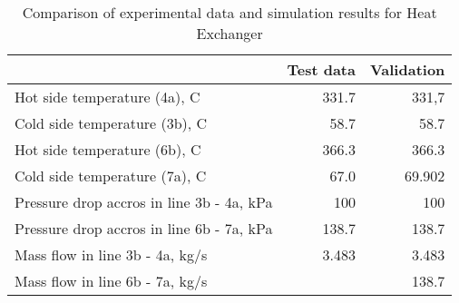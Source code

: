 \begin{table}
\label{tab:Comparison}
\caption{Comparison of experimental data and simulation results for Heat Exchanger}
\begin{center}
\begin{tabulary}{0.9\textwidth}{LRR}
\toprule
& Test data \cite{Iverson_2013}  & Validation \\
\midrule
Hot side temperature (4a), C & 331.7 & 331,7 \\
Cold side temperature (3b), C & 58.7 & 58.7 \\
Hot side temperature (6b), C & 366.3 & 366.3 \\
Cold side temperature (7a), C & 67.0 & 69.902 \\
Pressure drop accros in line 3b - 4a, kPa & 100 & 100 \\
Pressure drop accros in line 6b - 7a, kPa & 138.7 & 138.7 \\
Mass flow in line 3b - 4a, kg/s & 3.483 & 3.483 \\
Mass flow in line 6b - 7a, kg/s &  & 138.7 \\
\bottomrule
\end{tabulary}
\end{center}
\end{table}